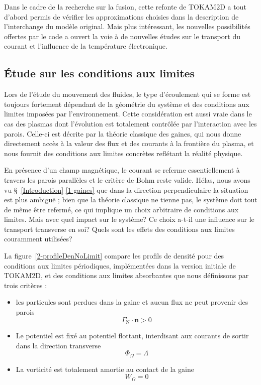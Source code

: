 \begin{refsection}
Dans le cadre de la recherche sur la fusion, cette refonte de TOKAM2D a tout
d'abord permis de vérifier les approximations choisies dans la description de
l'interchange du modèle original. Mais plus intéressant, les nouvelles
possibilités offertes par le code a ouvert la voie à de nouvelles études sur le transport du courant
et l'influence de la température électronique.

\subsection{Étude sur les conditions aux limites}
	
	Lors de l'étude du mouvement des fluides, le type d'écoulement qui se
	forme est toujours fortement dépendant de la géométrie du système et des conditions aux limites
	imposées par l'environnement. Cette considération est aussi vraie dans le
	cas des plasmas dont l'évolution est totalement contrôlée par l'interaction
	avec les parois. Celle-ci est décrite par la théorie classique des gaines,
	qui nous donne directement accès à la valeur des flux et des courants à la
	frontière du plasma, et nous fournit des conditions aux limites concrètes
	reflétant la réalité physique.
	
	En présence d'un champ magnétique, le courant se referme essentiellement
	à travers les parois parallèles et le critère de Bohm reste valide.
	Hélas, nous avons vu \S~\ref{Introduction}-\ref{1-gaines} que dans la direction
	perpendiculaire la situation est plus ambiguë ; bien que la théorie
	classique ne tienne pas, le système doit tout de même être refermé, ce qui
	implique un choix arbitraire de conditions aux limites. Mais avec quel impact sur le
	système? Ce choix a-t-il une influence sur le transport transverse en soi?
	Quels sont les effets des conditions aux limites couramment utilisées?
	
	La figure~\ref{2-profileDenNoLimit} compare les profils de densité pour des
	conditions aux limites périodiques, implémentées dans la version initiale de
	TOKAM2D, et des conditions aux limites absorbantes que nous définissons par
	trois critères :
	
	\begin{itemize}
	  \item les particules sont perdues dans la gaine et aucun flux ne peut
	  provenir des parois 
	  \begin{equation}
	  	\Gamma_\text{N}\cdot\mathbf n>0
	  \end{equation}
	  \item Le
	potentiel est fixé au potentiel flottant, interdisant aux
	courants de sortir dans la direction transverse
	\begin{equation}
	  	\Phi_\Omega=\Lambda
	  \end{equation}
	\item La vorticité est totalement amortie au contact de la gaine 
	\begin{equation}
	  	W_\Omega=0
	  \end{equation}
	\end{itemize}
	

\end{refsection}
